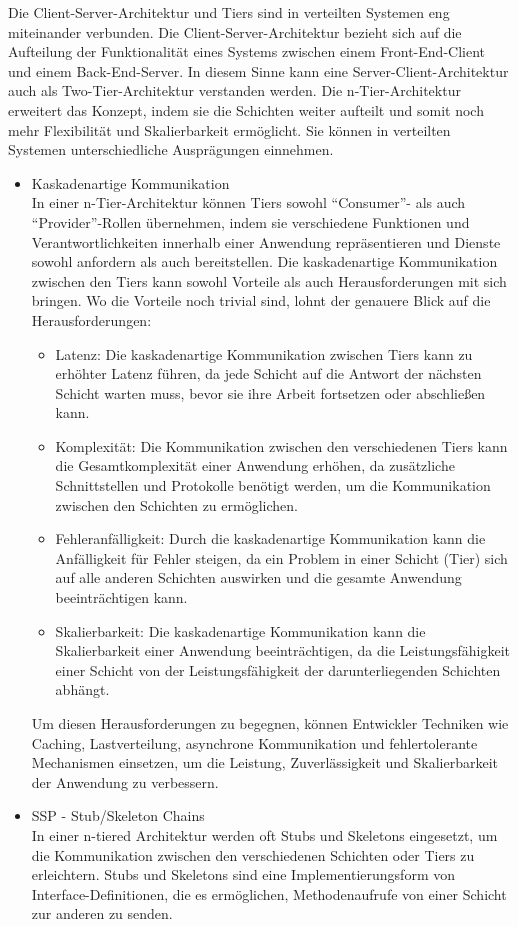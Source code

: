 Die Client-Server-Architektur und Tiers sind in verteilten Systemen eng miteinander verbunden. Die Client-Server-Architektur bezieht sich auf die Aufteilung der Funktionalität eines Systems zwischen einem Front-End-Client und einem Back-End-Server. In diesem Sinne kann eine Server-Client-Architektur auch als Two-Tier-Architektur verstanden werden. Die n-Tier-Architektur erweitert das Konzept, indem sie die Schichten weiter aufteilt und somit noch mehr Flexibilität und Skalierbarkeit ermöglicht. Sie können in verteilten Systemen unterschiedliche Ausprägungen einnehmen.
\begin{itemize}

\item Kaskadenartige Kommunikation\\
In einer n-Tier-Architektur können Tiers sowohl \enquote{Consumer}- als auch \enquote{Provider}-Rollen übernehmen, indem sie verschiedene Funktionen und Verantwortlichkeiten innerhalb einer Anwendung repräsentieren und Dienste sowohl anfordern als auch bereitstellen. Die kaskadenartige Kommunikation zwischen den Tiers kann sowohl Vorteile als auch Herausforderungen mit sich bringen. Wo die Vorteile noch trivial sind, lohnt der genauere Blick auf die Herausforderungen: 
\begin{itemize}
\item Latenz: Die kaskadenartige Kommunikation zwischen Tiers kann zu erhöhter Latenz führen, da jede Schicht auf die Antwort der nächsten Schicht warten muss, bevor sie ihre Arbeit fortsetzen oder abschließen kann.
\item Komplexität: Die Kommunikation zwischen den verschiedenen Tiers kann die Gesamtkomplexität einer Anwendung erhöhen, da zusätzliche Schnittstellen und Protokolle benötigt werden, um die Kommunikation zwischen den Schichten zu ermöglichen.
\item Fehleranfälligkeit: Durch die kaskadenartige Kommunikation kann die Anfälligkeit für Fehler steigen, da ein Problem in einer Schicht (Tier) sich auf alle anderen Schichten auswirken und die gesamte Anwendung beeinträchtigen kann.
\item Skalierbarkeit: Die kaskadenartige Kommunikation kann die Skalierbarkeit einer Anwendung beeinträchtigen, da die Leistungsfähigkeit einer Schicht von der Leistungsfähigkeit der darunterliegenden Schichten abhängt.
\end{itemize}
Um diesen Herausforderungen zu begegnen, können Entwickler Techniken wie Caching, Lastverteilung, asynchrone Kommunikation und fehlertolerante Mechanismen einsetzen, um die Leistung, Zuverlässigkeit und Skalierbarkeit der Anwendung zu verbessern.
\item SSP - Stub/Skeleton Chains\\
In einer n-tiered Architektur werden oft Stubs und Skeletons eingesetzt, um die Kommunikation zwischen den verschiedenen Schichten oder Tiers zu erleichtern. Stubs und Skeletons sind eine Implementierungsform von Interface-Definitionen, die es ermöglichen, Methodenaufrufe von einer Schicht zur anderen zu senden.


\end{itemize}
